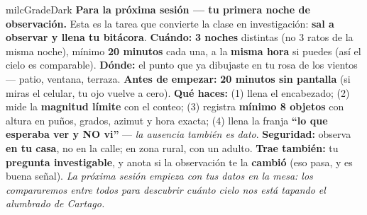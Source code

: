 \documentclass[11pt,letterpaper]{article}
\begin{document}
\begin{infoband}{milcGradeDark}
\textbf{Para la próxima sesión --- tu primera noche de observación.} Esta es la tarea que convierte la clase en investigación: \textbf{sal a observar y llena tu bitácora}. \textbf{Cuándo:} \textbf{3 noches} distintas (no 3 ratos de la misma noche), mínimo \textbf{20 minutos} cada una, a la \textbf{misma hora} si puedes (así el cielo es comparable). \textbf{Dónde:} el punto que ya dibujaste en tu rosa de los vientos --- patio, ventana, terraza. \textbf{Antes de empezar:} \textbf{20 minutos sin pantalla} (si miras el celular, tu ojo vuelve a cero). \textbf{Qué haces:} (1) llena el encabezado; (2) mide la \textbf{magnitud límite} con el conteo; (3) registra \textbf{mínimo 8 objetos} con altura en puños, grados, azimut y hora exacta; (4) llena la franja \textbf{``lo que esperaba ver y NO vi''} --- \emph{la ausencia también es dato}. \textbf{Seguridad:} observa \textbf{en tu casa}, no en la calle; en zona rural, con un adulto. \textbf{Trae también:} tu \textbf{pregunta investigable}, y anota si la observación te la \textbf{cambió} (eso pasa, y es buena señal). \emph{La próxima sesión empieza con tus datos en la mesa: los compararemos entre todos para descubrir cuánto cielo nos está tapando el alumbrado de Cartago.}
\end{infoband}
\end{document}

